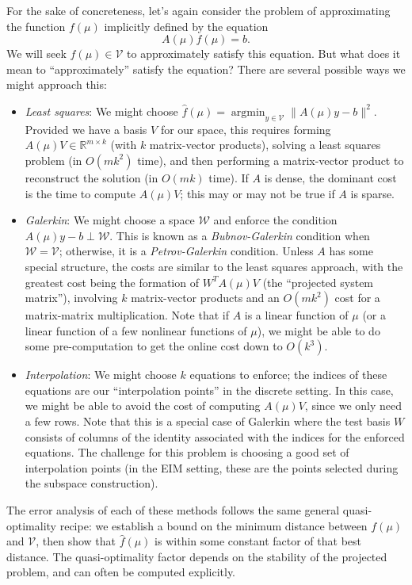 \documentclass[12pt, leqno]{article} %
\begin{document}
For the sake of concreteness, let's again consider the problem of
approximating the function $f(\mu)$ implicitly defined by the equation
\[
  A(\mu) f(\mu) = b.
\]
We will seek $\hat{f}(\mu) \in \mathcal{V}$ to approximately satisfy
this equation.  But what does it mean to ``approximately'' satisfy the
equation?  There are several possible ways we might approach this:
\begin{itemize}
\item {\em Least squares}: We might choose
  $\hat{f}(\mu) = \operatorname{argmin}_{y \in \mathcal{V}} \|A(\mu) y - b\|^2$.
  Provided we have a basis $V$ for our space, this requires forming
  $A(\mu) V \in \mathbb{R}^{m \times k}$ (with $k$ matrix-vector
  products), solving a least squares problem (in $O(mk^2)$ time), and
  then performing a matrix-vector product to reconstruct the solution
  (in $O(mk)$ time).  If $A$ is dense, the dominant cost is the
  time to compute $A(\mu) V$; this may or may not be true if $A$ is sparse.
\item {\em Galerkin}: We might choose a space $\mathcal{W}$ and
  enforce the condition $A(\mu) y - b \perp \mathcal{W}$.  This is
  known as a {\em Bubnov-Galerkin} condition when
  $\mathcal{W} = \mathcal{V}$; otherwise, it is a
  {\em Petrov-Galerkin} condition.  Unless $A$ has some special
  structure, the costs are similar to the least squares approach,
  with the greatest cost being the formation of $W^T A(\mu) V$
  (the ``projected system matrix''), involving $k$ matrix-vector
  products and an $O(mk^2)$ cost for a matrix-matrix multiplication.
  Note that if $A$ is a linear function of $\mu$ (or a linear function
  of a few nonlinear functions of $\mu$), we might be able to do some
  pre-computation to get the online cost down to $O(k^3)$.
\item {\em Interpolation}: We might choose $k$ equations to enforce;
  the indices of these equations are our ``interpolation points'' in
  the discrete setting.  In this case, we might be able to avoid the
  cost of computing $A(\mu) V$, since we only need a few rows.
  Note that this is a special case of Galerkin where the test basis
  $W$ consists of columns of the identity associated with the indices
  for the enforced equations.  The challenge for this problem is
  choosing a good set of interpolation points (in the EIM setting,
  these are the points selected during the subspace construction).
\end{itemize}

The error analysis of each of these methods follows the same general
quasi-optimality recipe: we establish a bound on the minimum distance
between $f(\mu)$ and $\mathcal{V}$, then show that $\hat{f}(\mu)$ is
within some constant factor of that best distance.  The
quasi-optimality factor depends on the stability of the projected
problem, and can often be computed explicitly.
\end{document}
